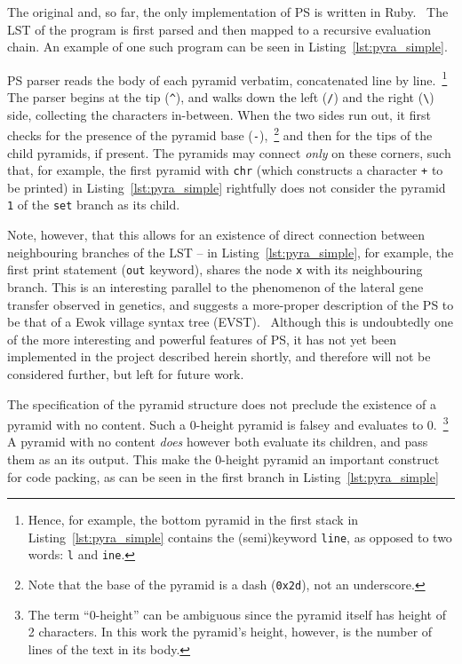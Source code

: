 \documentclass[aip,jcp,reprint,footinbib]{revtex4-1}
\let\tt\texttt
\begin{document}
The original and, so far, the only implementation of PS is written in Ruby.~\cite{pyra_git} The LST of the program is first parsed and then mapped to a recursive evaluation chain. An example of one such program can be seen in Listing~\ref{lst:pyra_simple}.

PS parser reads the body of each pyramid verbatim, concatenated line by line.~\footnote{Hence, for example, the bottom pyramid in the first stack in Listing~\ref{lst:pyra_simple} contains the (semi)keyword \tt{line}, as opposed to two words: \tt{l} and \tt{ine}.} The parser begins at the tip (\tt{\^}), and walks down the left (\tt{/}) and the right (\tt{\textbackslash}) side, collecting the characters in-between. When the two sides run out, it first checks for the presence of the pyramid base (\tt{-}),~\footnote{Note that the base of the pyramid is a dash (\tt{0x2d}), not an underscore.} and then for the tips of the child pyramids, if present. The pyramids may connect \emph{only} on these corners, such that, for example, the first pyramid with \tt{chr} (which constructs a character \tt{+} to be printed) in Listing~\ref{lst:pyra_simple} rightfully does not consider the pyramid \tt{1} of the \tt{set} branch as its child.

Note, however, that this allows for an existence of direct connection between neighbouring branches of the LST -- in Listing~\ref{lst:pyra_simple}, for example, the first print statement (\tt{out} keyword), shares the node \tt{x} with its neighbouring branch. This is an interesting parallel to the phenomenon of the lateral gene transfer observed in genetics, and suggests a more-proper description of the PS to be that of a Ewok village syntax tree (EVST).~\cite{keeling2008,smbc} Although this is undoubtedly one of the more interesting and powerful features of PS, it has not yet been implemented in the project described herein shortly, and therefore will not be considered further, but left for future work.

The specification of the pyramid structure does not preclude the existence of a pyramid with no content. Such a 0-height pyramid is falsey and evaluates to 0.~\footnote{The term \enquote{0-height} can be ambiguous since the pyramid itself has height of 2 characters. In this work the pyramid's height, however, is the number of lines of the text in its body.}~\cite{psnegation} A pyramid with no content \emph{does} however both evaluate its children, and pass them as an its output. This make the 0-height pyramid an important construct for code packing, as can be seen in the first branch in Listing~\ref{lst:pyra_simple}
\end{document}
